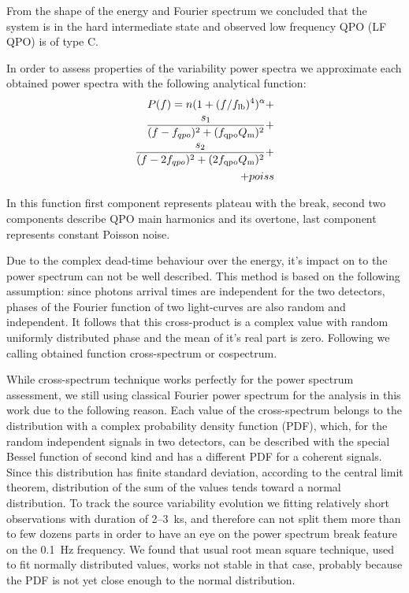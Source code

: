\documentclass[a4paper,fleqn,usenatbib]{mnras}
\begin{document}
    From the shape of the energy and Fourier spectrum we concluded that the system is in the hard intermediate state and observed low frequency QPO (LF QPO) is of type C. 

    In order to assess properties of the variability power spectra we approximate each obtained power spectra with the following analytical function:
\begin{equation}
        \begin{split}
        P(f) = n (1 + (f/f_{\rm lb})^4)^{\alpha} + \\
        \frac{s_1}{(f - f_{qpo})^2 + (f_{\rm qpo} Q_{\rm m})^2} +\\
        \frac{s_2}{(f - 2f_{qpo})^2 + (2f_{\rm qpo} Q_{\rm m})^2} + \\
        + poiss
\end{split}
        \label{eq:complex_fit}
\end{equation}


In this function first component represents plateau with the break, second two components describe QPO main harmonics and its overtone, last component represents constant Poisson noise.

Due to the complex dead-time behaviour over the energy, it's impact on to the power spectrum can not be well described. 
This method is based on the following assumption: since photons arrival times are independent for the two detectors, phases of the Fourier function of two light-curves are also random and independent.
It follows that this cross-product is a complex value with random uniformly distributed phase and the mean of it's real part is zero.
Following \cite{2015ApJ...800..109B} we calling obtained function cross-spectrum or cospectrum. 

While cross-spectrum technique works perfectly for the power spectrum assessment, we still using classical Fourier power spectrum for the analysis in this work due to the following reason.
Each value of the cross-spectrum belongs to the distribution with a complex probability density function (PDF), which,  for the random independent signals in two detectors, can be described with the special Bessel function of second kind and has a different PDF for a coherent signals. 
Since this distribution has finite standard deviation, according to the central limit theorem, distribution of the sum of the values tends toward a normal distribution.
To track the source variability evolution we fitting relatively short observations with duration of 2--3~ks, and therefore can not split them more than to few dozens parts in order to have an eye on the power spectrum break feature on the 0.1~Hz frequency. 
We found that usual root mean square technique, used to fit normally distributed values, works not stable in that case, probably because the PDF is not yet close enough to the normal distribution. 
\end{document}
